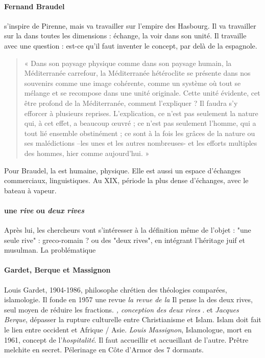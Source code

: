 \paragraph{Fernand Braudel} s'inspire de Pirenne, mais va travailler sur l'empire des Hasbourg. Il va travailler sur la \Med dans toutes les dimensions : échange, la voir dans son unité. Il travaille avec une question : est-ce qu'il faut inventer le concept, par delà de la \Med espagnole. 

\begin{quote}
    « Dans son paysage physique comme dans son paysage humain, la Méditerranée carrefour, la Méditerranée hétéroclite se présente dans nos souvenirs comme une image cohérente, comme un système où tout se mélange et se recompose dans une unité originale. Cette unité évidente, cet être profond de la Méditerranée, comment l’expliquer ? Il faudra s’y efforcer à plusieurs reprises. L’explication, ce n’est pas seulement la nature qui, à cet effet, a beaucoup œuvré ; ce n’est pas seulement l’homme, qui a tout lié ensemble obstinément ; ce sont à la fois les grâces de la nature ou ses malédictions –les unes et les autres nombreuses- et les efforts multiples des hommes, hier comme aujourd’hui. »
\end{quote}

Pour Braudel, la \Med est humaine, physique. Elle est aussi un espace d'échanges commerciaux, linguistiques. Au XIX, période la plus dense d'échanges, avec le bateau à vapeur. 


\paragraph{une \textit{rive} ou \textit{deux rives}}Après lui, les chercheurs vont s'intéresser à la définition même de l'objet : "une seule rive" : greco-romain ? ou des "deux rives", en intégrant l'héritage juif et musulman. La problématique 

\paragraph{Gardet, Berque et Massignon}{Louis Gardet, 1904-1986, philosophe chrétien des théologies comparées, islamologie. Il fonde en 1957 une revue \textit{la revue de la \Med}Il pense la \Med des deux rives, seul moyen de réduire les fractions. \textit{\Med, conception des deux rives } }. et \textit{Jacques Berque}, dépasser la rupture culturelle entre Christianisme et Islam. Islam doit fait le lien entre occident et Afrique / Asie. \textit{Louis Massignon}, Islamologue, mort en 1961, concept de l'\textit{hospitalité}. Il faut accueillir et accueillant de l'autre. Prêtre melchite en secret. Pélerinage en Côte d'Armor des 7 dormants.


